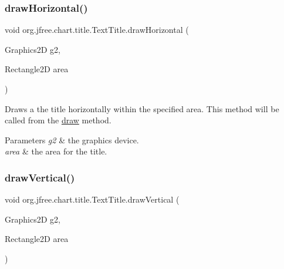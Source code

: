 \mbox{\label{classorg_1_1jfree_1_1chart_1_1title_1_1_text_title_a5df2253ecf06ed5b90958d1c7ac2e903}} 
\subsubsection{\texorpdfstring{draw\+Horizontal()}{drawHorizontal()}}
{\footnotesize\ttfamily void org.\+jfree.\+chart.\+title.\+Text\+Title.\+draw\+Horizontal (\begin{DoxyParamCaption}\item[{Graphics2D}]{g2,  }\item[{Rectangle2D}]{area }\end{DoxyParamCaption})\hspace{0.3cm}{\ttfamily [protected]}}

Draws a the title horizontally within the specified area. This method will be called from the \mbox{\hyperlink{classorg_1_1jfree_1_1chart_1_1title_1_1_text_title_a18f4f0fe150d298f6b85282690985a9d}{draw}} method.


\begin{DoxyParams}{Parameters}
{\em g2} & the graphics device. \\
\hline
{\em area} & the area for the title. \\
\hline
\end{DoxyParams}
\mbox{\label{classorg_1_1jfree_1_1chart_1_1title_1_1_text_title_a63dd967b28954cfcc5f8caf719ffc4a0}} 
\subsubsection{\texorpdfstring{draw\+Vertical()}{drawVertical()}}
{\footnotesize\ttfamily void org.\+jfree.\+chart.\+title.\+Text\+Title.\+draw\+Vertical (\begin{DoxyParamCaption}\item[{Graphics2D}]{g2,  }\item[{Rectangle2D}]{area }\end{DoxyParamCaption})\hspace{0.3cm}{\ttfamily [protected]}}


